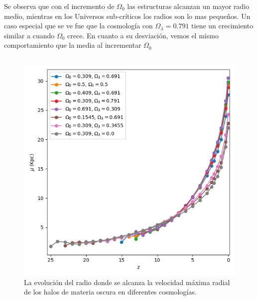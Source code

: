 \documentclass{beamer}
\begin{document}
	\begin{frame}
		 {\small Se observa que con el incremento de $\Omega_0$ las estructuras alcanzan un mayor radio medio, mientras en los Universos sub-críticos los radios son lo mas pequeños. }
		\only<2> {\small Un caso especial que se ve fue que la cosmología con $\Omega_\lambda=0.791$ tiene un crecimiento similar a cuando $\Omega_0$ crece.}
		\only<2> {\small En cuanto a su desviación, vemos el mismo comportamiento que la media al incrementar $\Omega_0$ }
		
		\begin{columns}[t]
			\begin{column}{.5\textwidth}
				\begin{figure}
					\centering
					\includegraphics[scale=0.27]{Conc/VMaxRad_Mean_Conc.png}
					\caption{\footnotesize La evolución del radio donde se alcanza la velocidad máxima radial de los halos de materia oscura en diferentes cosmologías.}
					\label{fig:Conc-VMAxRadMean}
				\end{figure}
			\end{column}


\end{columns}
\end{frame}
\end{document}
